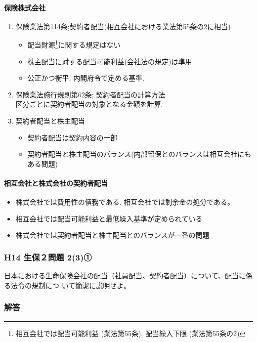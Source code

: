 \documentclass[report,gutter=10mm,fore-edge=10mm,uplatex,dvipdfmx]{jlreq}
\begin{document}
\paragraph{保険株式会社}
\begin{enumerate}
 \item 保険業法第114条;契約者配当(相互会社における業法第55条の2に相当)
\begin{itemize}
 \item 配当財源\footnote{ 相互会社では配当可能利益 (業法第55条),  配当繰入下限 (業法第55条の2)}に関する規定はない
 \item 株主配当に対する配当可能利益(会社法の規定)は準用
 \item 公正かつ衡平; 内閣府令で定める基準. 
\end{itemize}
 \item 保険業法施行規則第62条; 契約者配当の計算方法\\
       区分ごとに契約者配当の対象となる金額を計算.  
 \item 契約者配当と株主配当
\begin{itemize}
 \item 契約者配当は契約内容の一部
 \item 契約者配当と株主配当のバランス(内部留保とのバランスは相互会社にもある問題)
\end{itemize}
\end{enumerate}

\paragraph{相互会社と株式会社の契約者配当}
\begin{itemize}
 \item 株式会社では費用性の債務である. 相互会社では剰余金の処分である。
 \item 相互会社では配当可能利益と最低繰入基準が定められている
 \item 株式会社では契約者配当と株主配当とのバランスが一番の問題
\end{itemize}

\subsubsection{H14 生保２問題 2(3)①}
日本における生命保険会社の配当（社員配当、契約者配当）について、配当に係る法令の規制につ
いて簡潔に説明せよ。
\subsubsection{解答}
\end{document}
